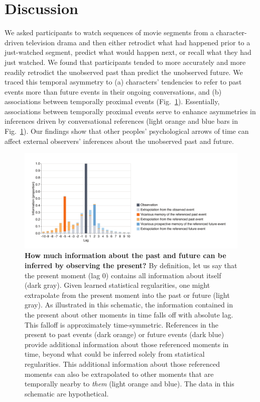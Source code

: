 \documentclass[10pt]{article}
\begin{document}
\section*{Discussion}

We asked participants to watch sequences of movie segments from a
character-driven television drama and then either retrodict what had happened
prior to a just-watched segment, predict what would happen next, or recall what
they had just watched. We found that participants tended to more accurately and
more readily retrodict the unobserved past than predict the unobserved future.
We traced this temporal asymmetry to (a) characters' tendencies to refer to
past events more than future events in their ongoing conversations, and (b)
associations between temporally proximal events (Fig.~\ref{fig:discussion}).
Essentially, associations between temporally proximal events serve to enhance
asymmetries in inferences driven by conversational references (light orange and
blue bars in Fig.~\ref{fig:discussion}). Our findings show that other peoples'
psychological arrows of time can affect external observers' inferences about
the unobserved past and future.

\begin{figure}[tp]
  \centering
  \includegraphics[width=\textwidth]{discussion}

  \caption{\textbf{How much information about the past and future can be
  inferred by observing the present?} By definition, let us say that the
  present moment (lag 0) contains all information about itself (dark gray).
  Given learned statistical regularities, one might extrapolate from the
  present moment into the past or future (light gray). As illustrated in this
  schematic, the information contained in the present about other moments in
  time falls off with absolute lag. This falloff is approximately
  time-symmetric. References in the present to past events (dark orange) or
  future events (dark blue) provide additional information about those
  referenced moments in time, beyond what could be inferred solely from
  statistical regularities. This additional information about those referenced
  moments can also be extrapolated to other moments that are temporally nearby
  to \textit{them} (light orange and blue). The data in this schematic are
  hypothetical.}

  \label{fig:discussion}
\end{figure}
\end{document}
